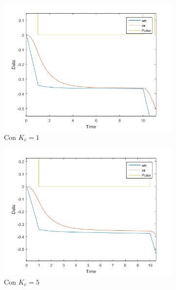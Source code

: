 \documentclass[a4paper, fontsize=11pt]{scrartcl} %
\numberwithin{equation}{section} %
\numberwithin{figure}{section} %
\numberwithin{table}{section} %
\begin{document}
	\begin{figure}[h!]
		\centering
		\begin{subfigure}[t]{.5\textwidth}
			\centering
			\includegraphics[width=1\linewidth]{images/Ke1.PNG}
			\caption{Con $K_e = 1$}
			\label{Ke1-FP}
		\end{subfigure}%
		\begin{subfigure}[t]{.5\textwidth}
			\centering
			\includegraphics[width=1\linewidth]{images/Ke5.PNG}
			\caption{Con $K_e = 5$}
			\label{Ke5-FP}
		\end{subfigure}
		\begin{subfigure}[t]{.5\textwidth}
			\centering

\end{subfigure}
\end{figure}
\end{document}
